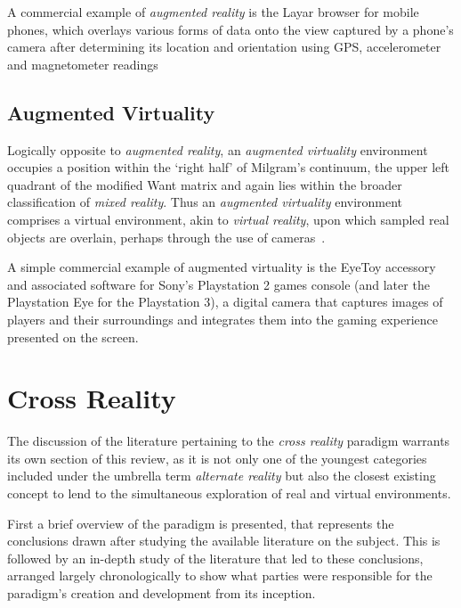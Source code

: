A commercial example of \textit{augmented reality} is the Layar browser for mobile phones, which overlays various forms of data onto the view captured by a phone's camera after determining its location and orientation using GPS, accelerometer and magnetometer readings~\cite{eishita:layar}


\subsection{Augmented Virtuality}
Logically opposite to \textit{augmented reality}, an \textit{augmented virtuality} environment occupies a position within the `right half' of Milgram's continuum, the upper left quadrant of the modified Want matrix and again lies within the broader classification of \textit{mixed reality}. Thus an \textit{augmented virtuality} environment comprises a virtual environment, akin to \textit{virtual reality}, upon which sampled real objects are overlain, perhaps through the use of cameras~\cite{caballero:behand}.

A simple commercial example of augmented virtuality is the EyeToy accessory and associated software for Sony's Playstation 2 games console (and later the Playstation Eye for the Playstation 3), a digital camera that captures images of players and their surroundings and integrates them into the gaming experience presented on the screen.


\section{Cross Reality}

\label{sec:cross_reality}
The discussion of the literature pertaining to the \textit{cross reality} paradigm warrants its own section of this review, as it is not only one of the youngest categories included under the umbrella term \textit{alternate reality} but also the closest existing concept to lend to the simultaneous exploration of real and virtual environments.

First a brief overview of the paradigm is presented, that represents the conclusions drawn after studying the available literature on the subject. This is followed by an in-depth study of the literature that led to these conclusions, arranged largely chronologically to show what parties were responsible for the paradigm's creation and development from its inception.

